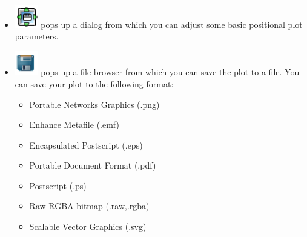 \documentclass[a4paper,11pt]{report}
\begin{document}
\begin{itemize}
\begin{itemize}
\item \includegraphics[width=1cm]{Figures/matplotlib_subplots.eps} pops up a dialog from 
which you can adjust some basic positional plot parameters.
\item \includegraphics[width=1cm]{Figures/matplotlib_filesave.eps} pops up a file browser from which you can save the plot to a file. 
You can save your plot to the following format:
\begin{itemize}
\item Portable Networks Graphics (.png)
\item Enhance Metafile (.emf)
\item Encapsulated Postscript (.eps)
\item Portable Document Format (.pdf)
\item Postscript (.ps)
\item Raw RGBA bitmap (.raw,.rgba)
\item Scalable Vector Graphics (.svg)
\end{itemize}
\end{itemize}


\end{itemize}
\end{document}
